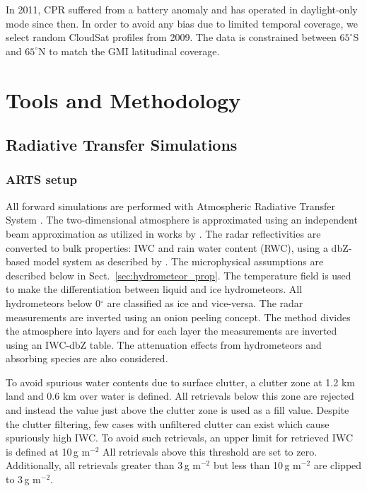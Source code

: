 \documentclass[amt, manuscript]{copernicus}
\begin{document}
In 2011, CPR suffered from a battery anomaly and has operated in daylight-only mode since then. In order to avoid any bias due to limited temporal coverage, we select random CloudSat profiles from 2009. The data is constrained between $65^{\circ}$S and $65^{\circ}$N to match the GMI latitudinal coverage. 


\section{Tools and Methodology}

\subsection{Radiative Transfer Simulations}
\label{sec:rt_simulations}

\subsubsection{ARTS setup}
\label{sec:arts_setup}
All forward simulations are performed with Atmospheric Radiative Transfer System \citep{eriksson:arts2:11}. The two-dimensional atmosphere is approximated using an independent beam approximation as utilized in works by \citet{ekelund2020using, eriksson:towar:20}. 
The radar reflectivities are converted to bulk properties: IWC and rain water content (RWC), using a dbZ-based model system as described by \citet{ekelund2020using}. The microphysical assumptions are described below in Sect.~\ref{sec:hydrometeor_prop}. The temperature field is used to make the differentiation between liquid and ice hydrometeors. All hydrometeors below 0$^{\circ}$ are classified as ice and vice-versa. The radar measurements are inverted using an onion peeling concept. The method  divides the atmosphere into layers and for each layer the measurements are inverted using an IWC-dbZ table. The attenuation effects from hydrometeors and absorbing species are also considered.

To avoid spurious water contents due to surface clutter, a clutter zone at 1.2\,\,km land and 0.6\,\,km over water is defined. All retrievals below this zone are rejected and instead the value just above the clutter zone is used as a fill value. Despite the clutter filtering, few cases with unfiltered clutter can exist which cause spuriously high IWC. To avoid such retrievals, an upper limit for retrieved IWC is defined at 10\,g m$^{-2}$ All retrievals above this threshold are set to zero. Additionally, all retrievals greater than 3\,g m$^{-2}$ but less than 10\,g m$^{-2}$ are clipped to 3\,g m$^{-2}$.
\end{document}
